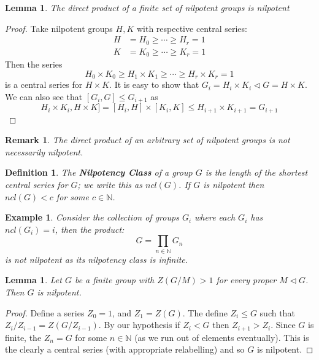 \documentclass[a4paper,10pt]{article}
\newcommand{\NN}{\mathbb{N}}
\newtheorem{Def}[thm]{Definition}
\newtheorem{eg}[thm]{Example}
\newtheorem{Lem}[thm]{Lemma}
\newtheorem{rem}[thm]{Remark}
\begin{document}
\begin{Lem}
The direct product of a finite set of nilpotent groups is nilpotent
\end{Lem}

\begin{proof}
Take nilpotent groups $H, K$ with respective central series:
\begin{align*}
H &= H_0 \geq \cdots \geq H_r = 1 \\
K &= K_0 \geq \cdots \geq K_r = 1
\end{align*}
Then the series
\[ H_0 \times K_0 \geq H_1 \times K_1 \geq \cdots \geq H_r \times K_r = 1 \]
is a central series for $H \times K$. It is easy to show that $G_i = H_i \times K_i \triangleleft G = H \times K$. We can also see that $[G_i, G] \leq G_{i+1}$ as
\[ H_i \times K_i, H \times K] = [H_i, H] \times [K_i, K] \leq H_{i+1} \times K_{i+1} = G_{i+1} \]
\end{proof}

\begin{rem}
The direct product of an arbitrary set of nilpotent groups is not necessarily nilpotent. 
\end{rem}

\begin{Def}
The \textbf{Nilpotency Class} of a group $G$ is the length of the shortest central series for $G$; we write this as $ncl(G)$. If $G$ is nilpotent then $ncl(G) < c$ for some $c \in \NN$. 
\end{Def}

\begin{eg}
Consider the collection of groups $G_i$ where each $G_i$ has $ncl(G_i) = i$, then the product:
\[ G = \prod_{n \in \NN} G_n \]
is not nilpotent as its nilpotency class is infinite.
\end{eg}

\begin{Lem}
Let $G$ be a finite group with $Z(G / M) > 1$ for every proper $M \triangleleft G$. Then $G$ is nilpotent.
\end{Lem}
\begin{proof}
Define a series $Z_0 = 1$, and $Z_1 = Z(G)$. The define $Z_i \leq G$ such that $Z_i / Z_{i-1} = Z(G / Z_{i-1})$. By our hypothesis if $Z_i < G$ then $Z_{i+1} > Z_i$. Since $G$ is finite, the $Z_n = G$ for some $n \in \NN$ (as we run out of elements eventually). This is the clearly a central series (with appropriate relabelling) and so $G$ is nilpotent. 
\end{proof}
\end{document}
